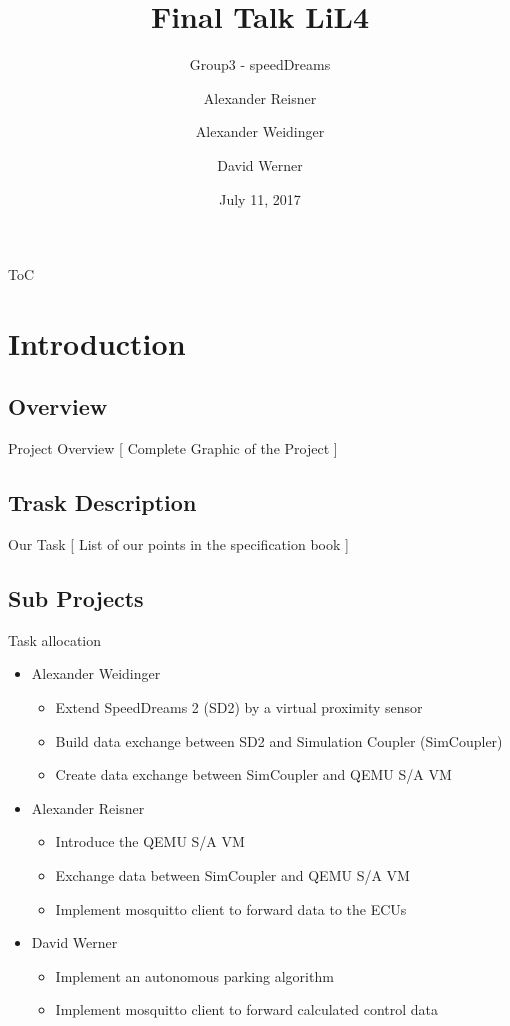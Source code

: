 \documentclass[aspectratio=169]{beamer}
\title{Final Talk LiL4}
\subtitle{Group3 - speedDreams}
\date{July 11, 2017}
\author{Alexander Reisner \and
Alexander Weidinger \and
David Werner}
\institute{Technische Universität München}
\begin{document}
  \renewcommand{\figurename}{\tiny Fig.}
  \maketitle

  \begin{frame}{ToC}
    \tableofcontents
  \end{frame}

  \section{Introduction}
  \subsection{Overview}
  \begin{frame}{Project Overview}
    [ Complete Graphic of the Project ]
  \end{frame}

  \subsection{Trask Description}
  \begin{frame}{Our Task}
    [ List of our points in the specification book ]
  \end{frame}

  \subsection{Sub Projects}
  \begin{frame}{Task allocation}
    \begin{itemize}
      \item Alexander Weidinger
      \begin{itemize}
        \item Extend SpeedDreams 2 (SD2) by a virtual proximity sensor
        \item Build data exchange between SD2 and Simulation Coupler (SimCoupler)
        \item Create data exchange between SimCoupler and QEMU S/A VM
      \end{itemize}
      \item Alexander Reisner
      \begin{itemize}
        \item Introduce the QEMU S/A VM
        \item Exchange data between SimCoupler and QEMU S/A VM
        \item Implement mosquitto client to forward data to the ECUs
      \end{itemize}
      \item David Werner
      \begin{itemize}
        \item Implement an autonomous parking algorithm
        \item Implement mosquitto client to forward calculated control data
      \end{itemize}
    \end{itemize}
  \end{frame}
\end{document}
